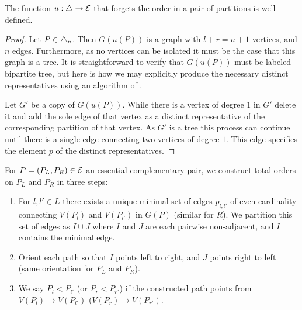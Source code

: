 \begin{lemma} 
\label{l:u-well-defined}
The function $u:\triangle \to \mathcal{E}$ that forgets the order in a pair of partitions is well defined.
\end{lemma}
\begin{proof}
Let $P \in \triangle_n$. Then $G(u(P))$ is a graph with $l+r=n+1$ vertices, and $n$ edges. Furthermore, as no vertices can be isolated it must be the case that this graph is a tree. 
It is straightforward to verify that $G(u(P))$ must be labeled bipartite tree, but here is how we may explicitly produce the necessary distinct representatives using an algorithm of \cite[Theorem 2]{kajitani1982number}.

Let $G'$ be a copy of $G(u(P))$. 
While there is a vertex of degree $1$ in $G'$ delete it and add the sole edge of that vertex as a distinct representative of the corresponding partition of that vertex. 
As $G'$ is a tree this process can continue until there is a single edge connecting two vertices of degree $1$. 
This edge specifies the element $p$ of the distinct representatives.
\end{proof}

\begin{construction} 
\label{Order Lemma}
For $P=(P_L,P_R) \in \mathcal{E}$ an essential complementary pair, we construct total orders on $P_L$ and $P_R$ in three steps:
\begin{enumerate}
    \item For $l,l' \in L$ there exists a unique minimal set of edges $p_{l,l'}$ of even cardinality connecting $V(P_l)$ and $V(P_{l'})$ in $G(P)$ (similar for $R$). We partition this set of edges as $I\cup J$ where $I$ and $J$ are each pairwise non-adjacent, and $I$ contains the minimal edge.
    \item Orient each path so that $I$ points left to right, and $J$ points right to left (same orientation for $P_L$ and $P_R$). 
    \item We say $P_l< P_{l'}$ (or $P_r < P_{r'}$) if the constructed path points from $V(P_l) \to V(P_{l'})$ ($V(P_r) \to V(P_{r'})$.
\end{enumerate}
\end{construction}

